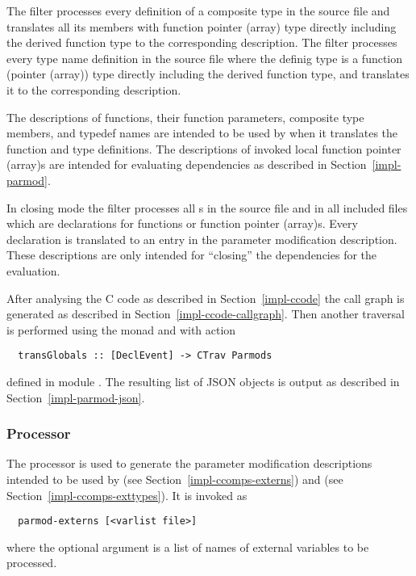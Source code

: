 The filter processes every definition of a composite type in the source file and translates all
its members with function pointer (array) type directly including the derived function type to the corresponding
description. The filter processes every type name definition in the source file where the definig type
is a function (pointer (array)) type directly including the derived function type, and translates it to
the corresponding description.

The descriptions of functions, their function parameters, composite type members, and typedef names are 
intended to be used by 
when it translates the function and type definitions. The descriptions of invoked local function pointer (array)s
are intended for evaluating dependencies as described in Section~\ref{impl-parmod}.

In closing mode the filter processes all s in the source file and in all included files which
are declarations for functions or function pointer (array)s. Every declaration is translated to an entry in the parameter
modification description. These descriptions are only intended for ``closing'' the dependencies for the evaluation.

After analysing the C code as described in Section~\ref{impl-ccode} the call graph is generated as described
in Section~\ref{impl-ccode-callgraph}. Then another traversal is performed using the  monad and
 with action
\begin{verbatim}
  transGlobals :: [DeclEvent] -> CTrav Parmods
\end{verbatim}
defined in module . The resulting list of JSON objects is output as described 
in Section~\ref{impl-parmod-json}.

\subsubsection{Processor }

The processor  is used to generate the parameter modification descriptions intended
to be used by  (see Section~\ref{impl-ccomps-externs}) and  
(see Section~\ref{impl-ccomps-exttypes}). It is invoked as
\begin{verbatim}
  parmod-externs [<varlist file>]
\end{verbatim}
where the optional argument is a list of names of external variables to be processed.

